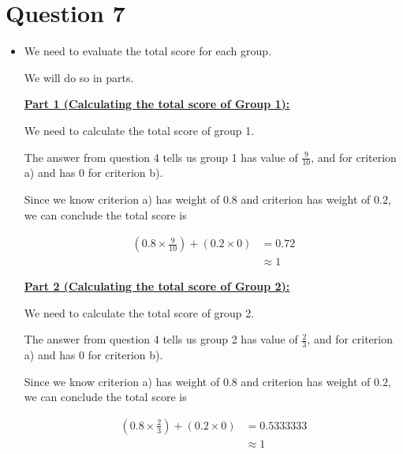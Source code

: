 \documentclass[12pt]{article}
\begin{document}
\section*{Question 7}
\begin{itemize}
    \item

    We need to evaluate the total score for each group.

    \bigskip

    We will do so in parts.

    \bigskip

    \underline{\textbf{Part 1 (Calculating the total score of Group 1):}}

    \bigskip

    We need to calculate the total score of group 1.

    \bigskip

    The answer from question 4 tells us group 1 has value of $\frac{9}{10}$, and
    for criterion a) and has $0$ for criterion b).

    \bigskip

    Since we know criterion a) has weight of $0.8$ and criterion has weight of $0.2$,
    we can conclude the total score is

    \setcounter{equation}{0}
    \begin{align}
        (0.8 \times \frac{9}{10}) + (0.2 \times 0 ) &= 0.72\\
        &\approx 1
    \end{align}

    \bigskip

    \underline{\textbf{Part 2 (Calculating the total score of Group 2):}}

    \bigskip

    We need to calculate the total score of group 2.

    \bigskip

    The answer from question 4 tells us group 2 has value of $\frac{2}{3}$, and
    for criterion a) and has $0$ for criterion b).

    \bigskip

    Since we know criterion a) has weight of $0.8$ and criterion has weight of $0.2$,
    we can conclude the total score is

    \begin{align}
        (0.8 \times \frac{2}{3}) + (0.2 \times 0 ) &= 0.5333333\\
        &\approx 1
    \end{align}


\end{itemize}
\end{document}
